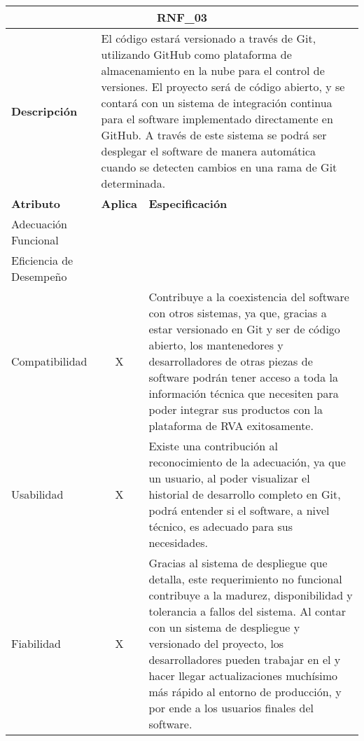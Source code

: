 \begin{center}
  \begin{tabular}{ | p{2cm}| p{8cm} | p{5cm} |}
    \hline
    \multicolumn{3}{|c|}{\textbf{RNF\_03}} \\
    \hline
    
    \multicolumn{1}{|p{2cm}|}{\textbf{Descripción}} & \multicolumn{2}{|p{13cm}|}{El código estará versionado a través de Git, utilizando GitHub como plataforma de almacenamiento en la nube para el control de versiones. El proyecto será de código abierto, y se contará con un sistema de integración continua para el software implementado directamente en GitHub. A través de este sistema se podrá ser desplegar el software de manera automática cuando se detecten cambios en una rama de Git determinada.} \\ \hline
    
    \multicolumn{1}{|p{3.5cm}|}{\textbf{{Atributo}}} & \multicolumn{1}{|p{1.5cm}|}{\textbf{Aplica}} & \multicolumn{1}{|p{10cm}|}{\textbf{Especificación}} \\ \hline
    
    \multicolumn{1}{|p{3.5cm}|}{\nohyphens{Adecuación Funcional}} & \multicolumn{1}{|c|}{} & \multicolumn{1}{|p{10cm}|}{} \\ \hline
    
    \multicolumn{1}{|p{3.5cm}|}{\nohyphens{Eficiencia de Desempeño}} & \multicolumn{1}{|c|}{} & \multicolumn{1}{|p{10cm}|}{} \\ \hline
    
    \multicolumn{1}{|p{3.5cm}|}{\nohyphens{Compatibilidad}} & \multicolumn{1}{|c|}{X} & \multicolumn{1}{|p{10cm}|}{Contribuye a la coexistencia del software con otros sistemas, ya que, gracias a estar versionado en Git y ser de código abierto, los mantenedores y desarrolladores de otras piezas de software podrán tener acceso a toda la información técnica que necesiten para poder integrar sus productos con la plataforma de RVA exitosamente.} \\ \hline
    
    \multicolumn{1}{|p{3.5cm}|}{\nohyphens{Usabilidad}} & \multicolumn{1}{|c|}{X} & \multicolumn{1}{|p{10cm}|}{Existe una contribución al reconocimiento de la adecuación, ya que un usuario, al poder visualizar el historial de desarrollo completo en Git, podrá entender si el software, a nivel técnico, es adecuado para sus necesidades.} \\ \hline
    
    \multicolumn{1}{|p{3.5cm}|}{\nohyphens{Fiabilidad}} & \multicolumn{1}{|c|}{X} & \multicolumn{1}{|p{10cm}|}{Gracias al sistema de despliegue que detalla, este requerimiento no funcional contribuye a la madurez, disponibilidad y tolerancia a fallos del sistema. Al contar con un sistema de despliegue y versionado del proyecto, los desarrolladores pueden trabajar en el y hacer llegar actualizaciones muchísimo más rápido al entorno de producción, y por ende a los usuarios finales del software.} \\ \hline
    

\end{tabular}
\end{center}
